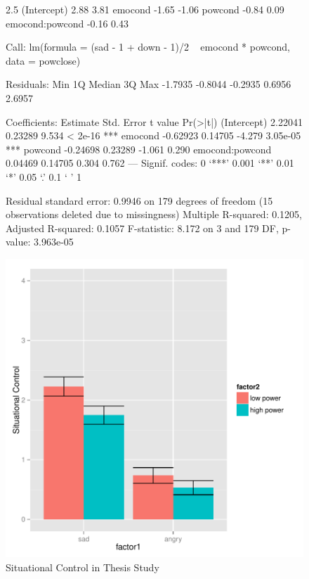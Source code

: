 \documentclass[man,apacite,floatsintext]{apa6}
\begin{document}
\begin{figure}
\begin{Schunk}
\begin{Soutput}
                2.5 %
(Intercept)      2.88   3.81
emocond         -1.65  -1.06
powcond         -0.84   0.09
emocond:powcond -0.16   0.43
\end{Soutput}
\begin{Soutput}
Call:
lm(formula = (sad - 1 + down - 1)/2 ~ emocond * powcond, data = powclose)

Residuals:
    Min      1Q  Median      3Q     Max 
-1.7935 -0.8044 -0.2935  0.6956  2.6957 

Coefficients:
                Estimate Std. Error t value Pr(>|t|)    
(Intercept)      2.22041    0.23289   9.534  < 2e-16 ***
emocond         -0.62923    0.14705  -4.279 3.05e-05 ***
powcond         -0.24698    0.23289  -1.061    0.290    
emocond:powcond  0.04469    0.14705   0.304    0.762    
---
Signif. codes:  0 ‘***’ 0.001 ‘**’ 0.01 ‘*’ 0.05 ‘.’ 0.1 ‘ ’ 1

Residual standard error: 0.9946 on 179 degrees of freedom
  (15 observations deleted due to missingness)
Multiple R-squared:  0.1205,	Adjusted R-squared:  0.1057 
F-statistic: 8.172 on 3 and 179 DF,  p-value: 3.963e-05
\end{Soutput}
\end{Schunk}
\includegraphics{PowerResults-ThesisSitPow}
\caption{Situational Control in Thesis Study}
\end{figure}
\end{document}
